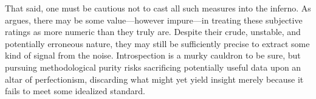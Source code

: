 That said, one must be cautious not to cast all such measures into the inferno. As \textcite{Labovitz1967} argues, there may be some value—however impure—in treating these subjective ratings as more numeric than they truly are. Despite their crude, unstable, and potentially erroneous nature, they may still be sufficiently precise to extract some kind of signal from the noise. Introspection is a murky cauldron to be sure, but pursuing methodological purity risks sacrificing potentially useful data upon an altar of perfectionism, discarding what might yet yield insight merely because it fails to meet some idealized standard.










